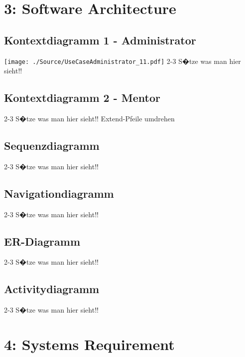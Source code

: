 \documentclass[10pt,a4paper]{scrartcl}
\begin{document}
\newpage
\tableofcontents
\listoftables

\newpage
\section{3: Software Architecture}
\subsection{Kontextdiagramm 1 - Administrator}
\texttt{[image: ./Source/UseCaseAdministrator\_11.pdf]}
2-3 S�tze was man hier sieht!!
\subsection{Kontextdiagramm 2 - Mentor}
2-3 S�tze was man hier sieht!!
Extend-Pfeile umdrehen
\subsection{Sequenzdiagramm}
2-3 S�tze was man hier sieht!!
\subsection{Navigationdiagramm}
2-3 S�tze was man hier sieht!!
\subsection{ER-Diagramm}
2-3 S�tze was man hier sieht!!
\subsection{Activitydiagramm}
2-3 S�tze was man hier sieht!!

\section{4: Systems Requirement}
\end{document}
